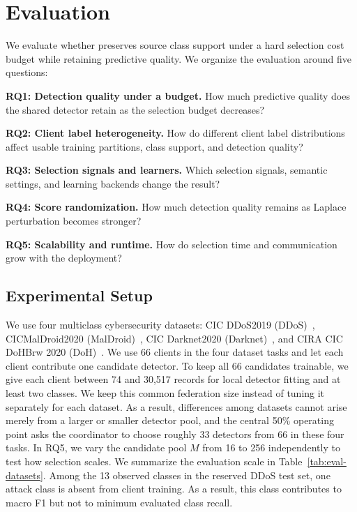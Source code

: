 
\section{Evaluation}
\label{sec:experiments}

We evaluate whether \Fname preserves source class support under a hard
selection cost budget while retaining predictive quality. We organize the
evaluation around five questions:
\begin{packeditemize}
    \item \textbf{RQ1: Detection quality under a budget.} How much predictive
    quality does the shared detector retain as the selection budget decreases?
    \item \textbf{RQ2: Client label heterogeneity.} How do different client
    label distributions affect usable training partitions, class support, and
    detection quality?
    \item \textbf{RQ3: Selection signals and learners.} Which selection
    signals, semantic settings, and learning backends change the result?
    \item \textbf{RQ4: Score randomization.} How much detection quality
    remains as Laplace perturbation becomes stronger?
    \item \textbf{RQ5: Scalability and runtime.} How do selection time and
    communication grow with the deployment?
\end{packeditemize}

\subsection{Experimental Setup}

 We use four multiclass cybersecurity datasets:
CIC DDoS2019 (DDoS)~\cite{cicddos19}, CICMalDroid2020
(MalDroid)~\cite{maldroid}, CIC Darknet2020
(Darknet)~\cite{darknet}, and CIRA CIC DoHBrw 2020
(DoH)~\cite{DoH}. We use 66 clients in the four dataset tasks and let each
client contribute one candidate detector. To keep all 66 candidates trainable,
we give each client between 74 and 30,517 records for local detector fitting
and at least two classes. We keep this common federation size instead of tuning
it separately for each dataset. As a result, differences among
datasets cannot arise merely from a larger or smaller detector pool, and the
central 50\% operating point asks the coordinator to choose roughly 33
detectors from 66 in these four tasks. In RQ5, we vary the candidate pool $M$
from 16 to 256 independently to test how selection scales. We summarize the evaluation scale in
Table~\ref{tab:eval-datasets}. Among the 13 observed classes in the reserved
DDoS test set, one attack class is absent from client training. As a result,
this class contributes to macro F1 but not to minimum evaluated class recall.

